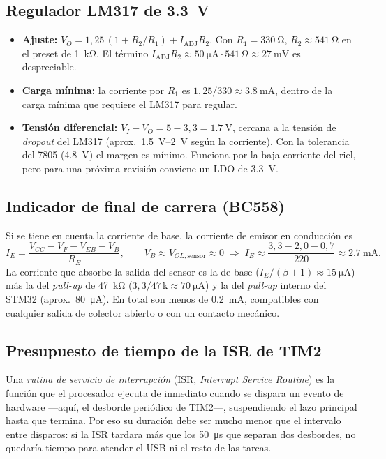 \subsection{Regulador LM317 de \SI{3,3}{\volt}}
\begin{itemize}
  \item \textbf{Ajuste:} $V_O = 1{,}25\,(1+R_2/R_1) + I_{\mathrm{ADJ}}R_2$. Con $R_1=\SI{330}{\ohm}$,
        $R_2\approx\SI{541}{\ohm}$ en el preset de \SI{1}{\kilo\ohm}. El término
        $I_{\mathrm{ADJ}}R_2\approx \SI{50}{\micro\ampere}\cdot\SI{541}{\ohm}\approx\SI{27}{\milli\volt}$
        es despreciable.
  \item \textbf{Carga mínima:} la corriente por $R_1$ es $1{,}25/330\approx\SI{3,8}{\milli\ampere}$,
        dentro de la carga mínima que requiere el LM317 para regular.
  \item \textbf{Tensión diferencial:} $V_I - V_O = 5 - 3{,}3 = \SI{1,7}{\volt}$, cercana a la
        tensión de \emph{dropout} del LM317 (aprox.\ \SIrange{1,5}{2}{\volt} según la corriente).
        Con la tolerancia del 7805 (\SI{4,8}{\volt}) el margen es mínimo. Funciona por la baja
        corriente del riel, pero para una próxima revisión conviene un LDO de \SI{3,3}{\volt}.
\end{itemize}

\subsection{Indicador de final de carrera (BC558)}
Si se tiene en cuenta la corriente de base, la corriente de emisor en conducción es
\begin{equation}
  I_E = \frac{V_{CC} - V_F - V_{EB} - V_{B}}{R_E},
  \qquad V_B \approx V_{OL,\mathrm{sensor}} \approx 0
  \;\Rightarrow\; I_E \approx \frac{3{,}3-2{,}0-0{,}7}{220} \approx \SI{2,7}{\milli\ampere}.
\end{equation}
La corriente que absorbe la salida del sensor es la de base
($I_E/(\beta+1)\approx\SI{15}{\micro\ampere}$) más la del \emph{pull-up} de \SI{47}{\kilo\ohm}
($3{,}3/47\,\mathrm{k}\approx\SI{70}{\micro\ampere}$) y la del \emph{pull-up} interno del STM32
(aprox.\ \SI{80}{\micro\ampere}). En total son menos de \SI{0,2}{\milli\ampere}, compatibles con
cualquier salida de colector abierto o con un contacto mecánico.

\subsection{Presupuesto de tiempo de la ISR de TIM2}
Una \emph{rutina de servicio de interrupción} (ISR, \emph{Interrupt Service Routine}) es la
función que el procesador ejecuta de inmediato cuando se dispara un evento de hardware —aquí, el
desborde periódico de TIM2—, suspendiendo el lazo principal hasta que termina. Por eso su
duración debe ser mucho menor que el intervalo entre disparos: si la ISR tardara más que los
\SI{50}{\micro\second} que separan dos desbordes, no quedaría tiempo para atender el USB ni el
resto de las tareas.

